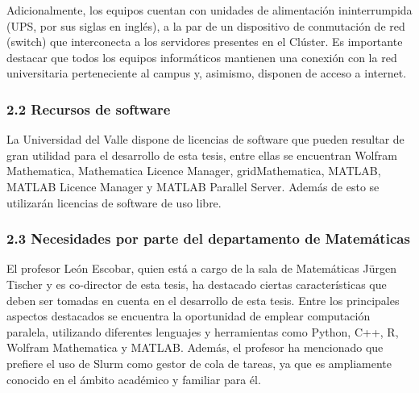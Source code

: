 \begin{spacing}{1.5}
  Adicionalmente, los equipos cuentan con unidades de alimentación
  ininterrumpida (UPS, por sus siglas en inglés), a la par de un dispositivo de
  conmutación de red (switch) que interconecta a los servidores presentes en el
  Clúster. Es importante destacar que todos los equipos informáticos mantienen
  una conexión con la red universitaria perteneciente al campus y, asimismo,
  disponen de acceso a internet.

  \subsubsection{2.2 Recursos de software}

  La Universidad del Valle dispone de licencias de software que pueden
  resultar de gran utilidad para el desarrollo de esta tesis, entre ellas se
  encuentran Wolfram Mathematica, Mathematica Licence Manager, gridMathematica,
  MATLAB, MATLAB Licence Manager y MATLAB Parallel Server. Además de esto se
  utilizarán licencias de software de uso libre.

  \subsubsection{2.3 Necesidades por parte del departamento de Matemáticas}

  El profesor León Escobar, quien está a cargo de la sala de Matemáticas
  Jürgen Tischer y es co-director de esta tesis, ha destacado ciertas
  características que deben ser tomadas en cuenta en el desarrollo de esta tesis.
  Entre los principales aspectos destacados se encuentra la oportunidad de
  emplear computación paralela, utilizando diferentes lenguajes y herramientas
  como Python, C++, R, Wolfram Mathematica y MATLAB.
  Además, el profesor ha mencionado que prefiere el uso de Slurm como gestor
  de cola de tareas, ya que es ampliamente conocido en el ámbito académico y
  familiar para él.

  \mylinespacing
  \mylinespacing
  \begin{tightcenter}
  \end{tightcenter}
\end{spacing}